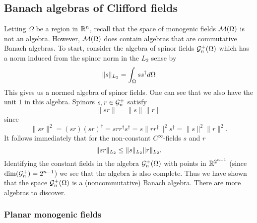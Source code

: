 \subsection{Banach algebras of Clifford fields}


Letting $\Omega$ be a region in $\mathbb{R}^n$, recall that the space of monogenic fields $\mathcal{M}(\Omega)$ is not an algebra. However, $\mathcal{M}(\Omega)$ does contain algebras that are commutative Banach algebras. To start, consider the algebra of spinor fields $\mathcal{G}_n^+(\Omega)$ which has a norm induced from the spinor norm in the $L_2$ sense by
\[
\|s\|_{L_2} = \int_\Omega ss^\dagger d\Omega
\]
This gives us a normed algebra of spinor fields. One can see that we also have the unit $1$ in this algebra. Spinors $s,r \in \mathcal{G}_n^+$ satisfy
\[
\|sr\| = \|s\|\|r\|
\]
since
\[
\|sr\|^2 = (sr)(sr)^\dagger = srr^\dagger s^\dagger = s\|rr^\dagger\|^2 s^\dagger = \|s\|^2 \|r\|^2.
\]
It follows immediately that for the non-constant $C^\infty$-fields $s$ and $r$
\[
\|sr\|_{L_2} \leq \|s\|_{L_2}\|r\|_{L_2}.
\]
Identifying the constant fields in the algebra $\mathcal{G}_n^+(\Omega)$ with points in $\mathbb{R}^{2^{n-1}}$ (since $\dim(\mathcal{G}_n^+)=2^{n-1}$) we see that the algebra is also complete. Thus we have shown that the space $\mathcal{G}_n^+(\Omega)$ is a (noncommutative) Banach algebra. There are more algebras to discover.

\subsubsection{Planar monogenic fields}


